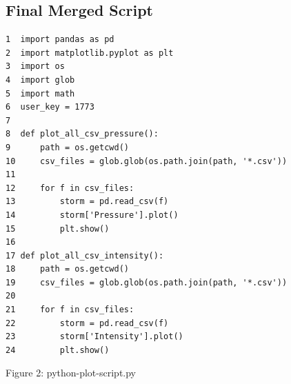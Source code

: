 \documentclass[]{article}
\begin{document}
\subsection{Final Merged Script}
\begin{tcolorbox}[colback=white, colframe=black, boxrule=1pt,
    title=python-plot-script.py, fonttitle=\bfseries, listing only, listing options={language=sh, basicstyle=\ttfamily}]
\begin{verbatim}
1  import pandas as pd
2  import matplotlib.pyplot as plt
3  import os
4  import glob
5  import math
6  user_key = 1773
7   
8  def plot_all_csv_pressure():
9      path = os.getcwd()
10     csv_files = glob.glob(os.path.join(path, '*.csv'))
11        
12     for f in csv_files:
13         storm = pd.read_csv(f)
14         storm['Pressure'].plot()
15         plt.show()
16    
17 def plot_all_csv_intensity():
18     path = os.getcwd()
19     csv_files = glob.glob(os.path.join(path, '*.csv'))
20        
21     for f in csv_files:
22         storm = pd.read_csv(f)
23         storm['Intensity'].plot()
24         plt.show()
\end{verbatim}
\end{tcolorbox}
\begin{center}
    Figure 2: python-plot-script.py
\end{center}
\end{document}
